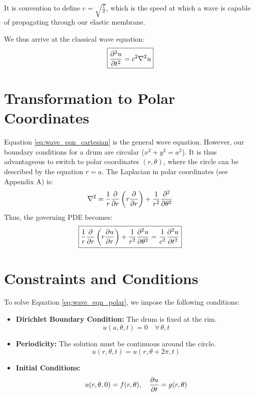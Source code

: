 \documentclass[11pt, letterpaper]{article}
\begin{document}
It is convention to define $c = \sqrt{\frac{T}{\sigma}}$, which is the speed at which a wave is capable of propagating through our elastic membrane. 

We thus arrive at the classical wave equation:
\begin{equation}
    \boxed{\pdv[2]{u}{t} = c^2 \nabla^2 u}
    \label{eq:wave_eqn_cartesian}
\end{equation}

\section{Transformation to Polar Coordinates}

Equation \ref{eq:wave_eqn_cartesian} is the general wave equation. However, our boundary conditions for a drum are circular ($x^2 + y^2 = a^2$). It is thus advantageous to switch to polar coordinates $(r, \theta)$, where the circle can be described by the equation $r = a$. The Laplacian in polar coordinates (see Appendix A) is:
\begin{equation}
    \nabla^2 = \frac{1}{r} \pdv{r} \left( r \pdv{r} \right) + \frac{1}{r^2} \pdv[2]{\theta}
\end{equation}
Thus, the governing PDE becomes:
\begin{equation}
    \boxed{\frac{1}{r} \pdv{r} \left( r \pdv{u}{r} \right) + \frac{1}{r^2} \pdv[2]{u}{\theta} = \frac{1}{c^2} \pdv[2]{u}{t}}
    \label{eq:wave_eqn_polar}
\end{equation}

\pagebreak

\section{Constraints and Conditions}

To solve Equation \ref{eq:wave_eqn_polar}, we impose the following conditions:
\begin{itemize}
    \item \textbf{Dirichlet Boundary Condition:} The drum is fixed at the rim.
    \begin{equation}
        u(a, \theta, t) = 0 \quad \forall\, \theta, t
    \end{equation}
    \item \textbf{Periodicity:} The solution must be continuous around the circle.
    \begin{equation}
        u(r, \theta, t) = u(r, \theta + 2\pi, t)
    \end{equation}
    \item \textbf{Initial Conditions:}
    \begin{equation}
        u(r, \theta, 0) = f(r, \theta), \quad \pdv{u}{t}(r, \theta, 0) = g(r, \theta)
    \end{equation}
\end{itemize}
\end{document}
